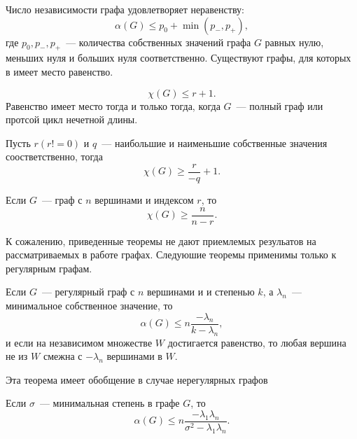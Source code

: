 \begin{theorem}
     Число независимости графа удовлетворяет
    неравенству:
    \begin{equation}
        \alpha(G) \leq p_0 + \min(p_-, p_+),
    \end{equation}
    где $p_0,p_-,p_+$~--- количества собственных значений графа $G$
    равных нулю, меньших нуля и больших нуля соответственно. Существуют
    графы, для которых в  имеет место равенство.
\end{theorem}

\begin{theorem}
    \begin{equation}
        \chi(G) \leq r + 1.
    \end{equation} Равенство имеет место тогда и только тогда, когда $G$~---
    полный граф или протсой цикл нечетной длины.
\end{theorem}

\begin{theorem}
     Пусть $r (r != 0)$ и $q$~--- наибольшие и
    наименьшие собственные значения соостветственно, тогда
    \begin{equation}
        \chi(G) \geq \frac{r}{-q} + 1.
    \end{equation}
\end{theorem}

\begin{theorem}
     Если $G$~--- граф с $n$ вершинами и индексом
    $r$, то
    \begin{equation}
        \chi(G) \geq \frac{n}{n-r}.
    \end{equation}
\end{theorem}

К сожалению, приведенные теоремы не дают приемлемых резульатов на 
рассматриваемых в работе графах. Следуюшие теоремы применимы только к 
регулярным графам.

\begin{theorem}
     Если $G$~--- регулярный граф с $n$ вершинами и
    и степенью $k$, а $\lambda_n$~--- минимальное собственное значение, то
    \begin{equation}
        \alpha(G) \leq n\frac{-\lambda_n}{k-\lambda_n},
    \end{equation}
    и если на независимом множестве $W$ достигается равенство, то любая вершина
    не из $W$ смежна с $-\lambda_n$ вершинами в $W$.
\end{theorem}
Эта теорема имеет обобщение в случае нерегулярных графов
\begin{theorem}
     Если $\sigma$~--- минимальная степень в графе $G$,
    то
    \begin{equation}
        \alpha(G) \leq
            n\frac{-\lambda_1\lambda_n}{\sigma^2-\lambda_1\lambda_n}.
    \end{equation}
\end{theorem}

